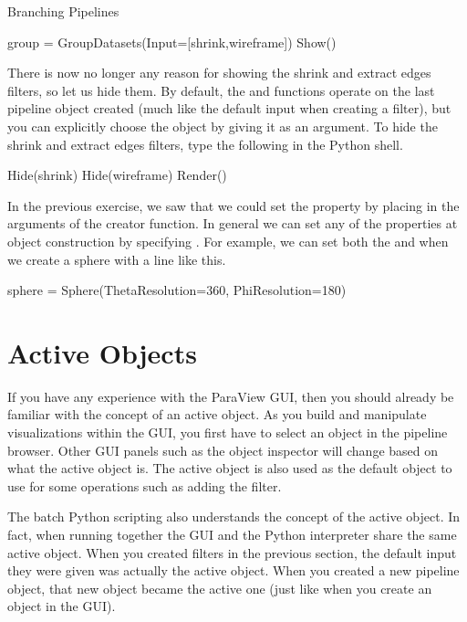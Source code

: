 \begin{exercise}{Branching Pipelines}
  \begin{python}
group = GroupDatasets(Input=[shrink,wireframe])
Show()
  \end{python}

  There is now no longer any reason for showing the shrink and extract
  edges filters, so let us hide them.  By default, the  and
   functions operate on the last pipeline object created (much
  like the default input when creating a filter), but you can explicitly
  choose the object by giving it as an argument.  To hide the shrink and
  extract edges filters, type the following in the Python shell.

  \begin{python}
Hide(shrink)
Hide(wireframe)
Render()
  \end{python}
\end{exercise}

In the previous exercise, we saw that we could set the 
property by placing  in the arguments
of the creator function.  In general we can set any of the properties at
object construction by specifying .  For example, we can set both the
 and  when we create a sphere
with a line like this.

\begin{python}
sphere = Sphere(ThetaResolution=360, PhiResolution=180)
\end{python}


\section{Active Objects}
\label{sec:ActiveObjects}

If you have any experience with the ParaView GUI, then you should already
be familiar with the concept of an active object.  As you build and
manipulate visualizations within the GUI, you first have to select an
object in the pipeline browser.  Other GUI panels such as the object
inspector will change based on what the active object is.  The active
object is also used as the default object to use for some operations such
as adding the filter.

The batch Python scripting also understands the concept of the active
object.  In fact, when running together the GUI and the Python interpreter
share the same active object.  When you created filters in the previous
section, the default input they were given was actually the active object.
When you created a new pipeline object, that new object became the active
one (just like when you create an object in the GUI).

